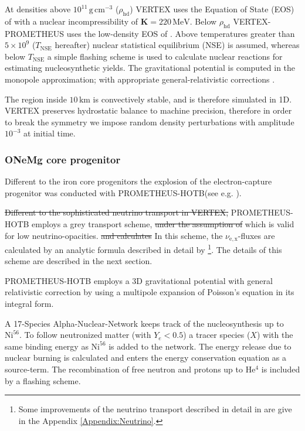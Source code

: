 \documentclass[fleqn,usenatbib]{mnras}
\newcommand{\helium}{$\mathrm{He^{4}}$\xspace}
\newcommand{\gcc}{\text{g}\, \text{cm}^{-3}}
\newcommand{\prom}{\textsc{P{\footnotesize ROMETHEUS}-H{\footnotesize OT}B}\xspace}
\newcommand{\vertexprom}{\textsc{V{\footnotesize ERTEX}-P{\footnotesize ROMETHEUS}}\xspace}
\newcommand{\vertex}{\textsc{V{\footnotesize ERTEX}}\xspace}
\newcommand{\NY}[2]{{\color{blue}\sout{#1}#2}}
\begin{document}
At densities above $10^{11}\,\gcc$ ($\rho_{\text{hd}}$) \vertex uses  the Equation of State (EOS) of \cite{Lattimer1991} with a nuclear incompressibility of $\mathbf{K}=220\, \text{MeV}$. Below $\rho_{\text{hd}}$ \vertexprom uses the low-density EOS of \cite{Janka1999}. Above  temperatures greater than $5\times10^{9}$ ($T_{\text{NSE}}$ hereafter) nuclear statistical equilibrium (NSE) is assumed, whereas below $T_{\text{NSE}}$ a simple flashing scheme is used to calculate nuclear reactions for estimating nucleosynthetic yields. The gravitational potential is computed in the monopole approximation; with appropriate general-relativistic corrections \citet{Marek2006}.

The region inside $10\,\text{km}$ is  convectively stable, and is therefore simulated in 1D. \vertex preserves hydrostatic balance to machine precision, therefore in order to break the symmetry we impose random density perturbations with amplitude $10^{-3}$ at initial time. 
\subsubsection{ONeMg core progenitor}
Different to the iron core progenitors the explosion of the electron-capture progenitor was conducted with \prom (see e.g. \citet{Wongwathanarat2012,Wongwathanarat2013}).

\NY{Different to the sophisticated neutrino transport in \vertex,}{} \prom employs a grey transport scheme\NY{}{,} \NY{under the assumption of}{ which is valid for} low neutrino-opacities\NY{}{.} \NY{and calculates}{ In this scheme,} the $\nu_{\mathrm{e,x}}$-fluxes \NY{}{are calculated} by an analytic formula described in detail by \cite{Scheck2006}\footnote{Some improvements of the neutrino transport described in detail in \cite{Scheck2006} are give in the Appendix \ref{Appendix:Neutrino}.}. The details of this scheme are described in the next section.

\prom employs a 3D gravitational potential with general relativistic correction by using a multipole expansion of Poisson's equation in its integral form. 

A 17-Species Alpha-Nuclear-Network keeps track of the nucleosynthesis up to $\mathrm{Ni}^{56}$. To follow neutronized matter (with $Y_e < 0.5 $) a tracer species ($X$) with the same binding energy as $\mathrm{Ni}^{56}$ is added to the network. The energy release due to nuclear burning is calculated and enters the energy conservation equation as a source-term. 
The recombination of free neutron and protons up to \helium is included by a flashing scheme.
\end{document}

